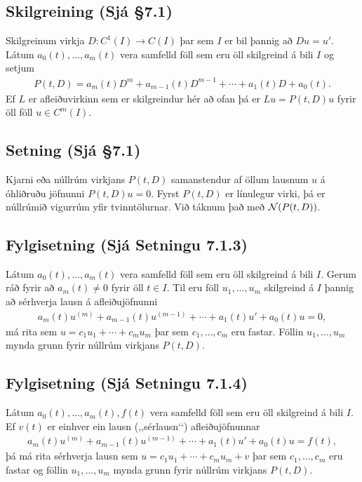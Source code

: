 \documentclass[a4paper,10pt,icelandic]{sphinxmanual}
\begin{document}
\subsection{Skilgreining (Sjá \S{}7.1)}
\label{\detokenize{Kafli07:id2}}
Skilgreinum virkja \(D:C^1(I)\to C(I)\) þar sem \(I\) er bil þannig að \(Du=u'\). Látum \(a_0(t), \ldots, a_m(t)\) vera samfelld föll sem eru öll skilgreind á bili \(I\) og setjum
\begin{equation*}
\begin{split}P(t,D)= a_m(t)D^{m}+a_{m-1}(t)D^{m-1}+
\cdots+a_1(t)D+a_0(t).\end{split}
\end{equation*}
Ef \(L\) er afleiðuvirkinn sem er skilgreindur hér að ofan þá er \(Lu=P(t,D)u\) fyrir öll föll \(u\in C^m(I)\).


\subsection{Setning (Sjá \S{}7.1)}
\label{\detokenize{Kafli07:setning-sja-7-1}}
Kjarni eða núllrúm virkjans \(P(t,D)\) samanstendur af öllum lausnum \(u\) á óhliðruðu jöfnunni \(P(t,D)u=0\). Fyrst \(P(t,D)\) er línulegur virki, þá er núllrúmið vigurrúm yfir tvinntölurnar. Við táknum það með \({\cal N}(P(t,D))\).


\subsection{Fylgisetning (Sjá Setningu 7.1.3)}
\label{\detokenize{Kafli07:fylgisetning-sja-setningu-7-1-3}}
Látum \(a_0(t), \ldots, a_m(t)\) vera samfelld föll sem eru öll skilgreind á bili \(I\). Gerum ráð fyrir að \(a_m(t)\neq 0\) fyrir öll \(t\in I\). Til eru föll \(u_1, \ldots, u_m\) skilgreind á \(I\) þannig að sérhverja lausn á afleiðujöfnunni
\begin{equation*}
\begin{split}a_m(t)u^{(m)}+a_{m-1}(t)u^{(m-1)}+\cdots+a_1(t)u'+a_0(t)u=0,\end{split}
\end{equation*}
má rita sem \(u=c_1u_1+\cdots+c_mu_m\) þar sem \(c_1, \ldots, c_m\) eru fastar. Föllin \(u_1, \ldots, u_m\) mynda grunn fyrir núllrúm virkjans \(P(t,D)\).


\subsection{Fylgisetning (Sjá Setningu 7.1.4)}
\label{\detokenize{Kafli07:fylgisetning-sja-setningu-7-1-4}}
Látum \(a_0(t), \ldots, a_m(t), f(t)\) vera samfelld föll sem eru öll skilgreind á bili \(I\). Ef \(v(t)\) er einhver ein lausn (,,sérlausn‘‘) afleiðujöfnunnar
\begin{equation*}
\begin{split}a_m(t)u^{(m)}+a_{m-1}(t)u^{(m-1)}+\cdots+a_1(t)u'+a_0(t)u=f(t),\end{split}
\end{equation*}
þá má rita sérhverja lausn sem \(u=c_1u_1+\cdots+c_mu_m+v\) þar sem \(c_1, \ldots, c_m\) eru fastar og föllin \(u_1, \ldots, u_m\) mynda grunn fyrir núllrúm virkjans \(P(t,D)\).
\end{document}
